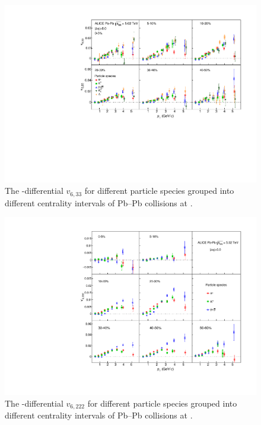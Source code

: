 \documentclass[ALICE,manyauthors]{cernphprep}
\begin{document}
\begin{figure}[!htb]
\begin{center}
\includegraphics[scale=0.82]{figures/results/All_v633_gap00_PID2_3by2.pdf}

\end{center}
\caption{The \pT-differential $v_{6,33}$ for different particle species grouped into different centrality intervals of Pb--Pb collisions at \sNN.}
\label{v633_particleDependence}
\end{figure}

\begin{figure}[!htb]
\begin{center}
\includegraphics[scale=0.82]{figures/results/All_v6222_gap00_PID2_3by3.pdf}

\end{center}
\caption{The \pT-differential $v_{6,222}$ for different particle species grouped into different centrality intervals of Pb--Pb collisions at \sNN.}
\label{v6222_particleDependence}
\end{figure}
\end{document}
